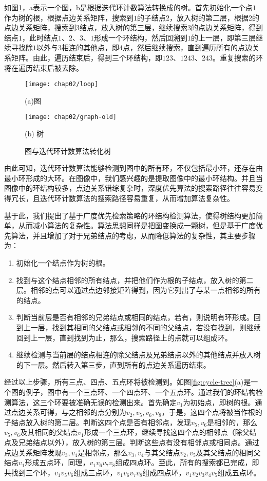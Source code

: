 如图\ref{fig:graph-tree}，a表示一个图，b是根据迭代环计数算法转换成的树。首先初始化一个点$1$作为树的根，根据点边关系矩阵，搜索到$1$的子结点$2$，放入树的第二层，根据$2$的点边关系矩阵，搜索到$3$结点，放入树的第三层，继续搜索$3$的点边关系矩阵，得到结点$1$，此时结点$1$、$2$、$3$、$1$形成一个环结构，然后回溯到$1$的上一层，即第三层继续寻找除$1$以外与$3$相连的其他点，即$4$点，然后继续搜索，直到遍历所有的点边关系矩阵。由此，遍历结束后，得到三个环结构，即$123$、$1243$、$243$。重复搜索的环将在遍历结束后被去除。
\begin{figure}[H]
\centering
  \begin{minipage}[b]{0.48\textwidth} 
      \centering 
      \texttt{[image: chap02/loop]}
        \centerline{(a)图}\medskip
    \end{minipage}
  \begin{minipage}[b]{0.48\textwidth}
    \centering
    \texttt{[image: chap02/graph-old]}
      \centerline{(b) 树}\medskip
  \end{minipage}
\caption{图与迭代环计数算法转化树}
\label{fig:graph-tree}
\end{figure}

由此可知，迭代环计数算法能够检测到图中的所有环，不仅包括最小环，还存在由最小环形成的大环。在图像中，我们感兴趣的是提取图像中的最小环结构。并且当图像中的环结构较多，点边关系错综复杂时，深度优先算法的搜索路径往往容易变得冗长，且迭代环计数算法的搜索路径容易重复，从而增加算法复杂性。

基于此，我们提出了基于广度优先检索策略的环结构检测算法，使得树结构更加简单，从而减小算法的复杂性。算法思想同样是把图变换成一颗树，但是基于广度优先算法，并且增加了对于兄弟结点的考虑，从而降低算法的复杂性，其主要步骤为：
\begin{enumerate}
\item 初始化一个结点作为树的根。
\item 找到与这个结点相邻的所有结点，并把他们作为根的子结点，放入树的第二层。相邻的点可以通过点边邻接矩阵得到，因为它列出了与某一点相邻的所有的结点。
\item 判断当前层是否有相邻的兄弟结点或相同的结点，若有，则说明有环形成。回到上一层，找到其相同的父结点或相邻的不同的父结点，若没有找到，则继续回到上一层，直到找到为止，那么，搜索路径上的点就可以组成环。
\item 继续检测与当前层的结点相连的除父结点及兄弟结点以外的其他结点并放入树的下一层。然后转入第三步，直到所有的点边关系遍历结束。
\end{enumerate}
经过以上步骤，所有三点、四点、五点环将被检测到。如图\ref{fig:cycle-tree}(a)是一个图的例子，图中有一个三点环、一个四点环、一个五点环。通过我们的环结构检测算法，这三个环要被准确无误的检测出来。首先确定$v_1$为初始点，即树的根。通过点边关系可得，与之相邻的点分别为$v_2, v_5, v_6, v_8$，于是，这四个点将被当作根的子结点放入树的第二层。判断这四个点是否有相邻点，发现$v_5, v_6$是相邻的，那么$v_5, v_6$及其相同的父结点$v_1$形成一个三点环，继续寻找这四个点的相邻点（除父结点及兄弟结点以外），放入树的第三层。判断这些点有没有相邻点或相同点。通过点边关系矩阵发现$v_3,v_4$是相邻点，那么$v_3,v_4$与其父结点$v_2,v_5$及其父结点的相同父结点$v_1$形成五点环，同理，$v_{1}v_{6}v_{7}v_{8}$组成四点环。至此，所有的搜索都已完成，即共找到三个环，$v_{1}v_{5}v_{6}$组成三点环，$v_{1}v_{6}v_{7}v_{8}$组成四点环，$v_{1}v_{2}v_{3}v_{4}v_{5}$组成五点环。

